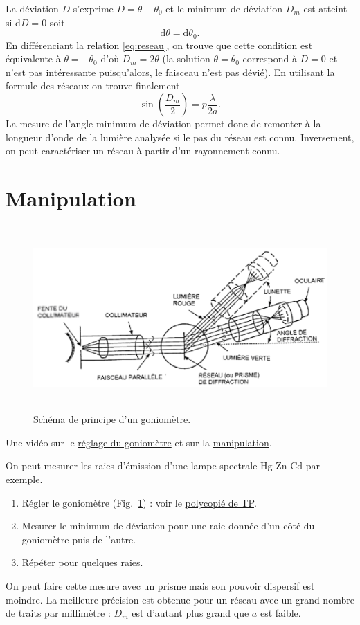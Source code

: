 \documentclass[12pt,a4paper]{article}
\renewcommand{\d}{\mathrm{d}}
\begin{document}
La déviation $D$ s'exprime $D=\theta-\theta_0$ et le minimum de déviation $D_m$ est atteint si $\d D = 0$ soit
\begin{equation}
\d\theta = \d\theta_0.
\end{equation}
En différenciant la relation \eqref{eq:reseau}, on trouve que cette condition est équivalente à $\theta=-\theta_0$ d'où $D_m = 2\theta$ (la solution $\theta=\theta_0$ correspond à $D=0$ et n'est pas intéressante puisqu'alors, le faisceau n'est pas dévié).
En utilisant la formule des réseaux on trouve finalement
\begin{equation}
\sin\left(\frac{D_m}{2}\right) = p\frac{\lambda}{2a}.
\end{equation}
La mesure de l'angle minimum de déviation permet donc de remonter à la longueur d'onde de la lumière analysée si le pas du réseau est connu.
Inversement, on peut caractériser un réseau à partir d'un rayonnement connu.

\section{Manipulation}

\begin{figure}
\center
\includegraphics[height=200pt]{goniometre.png}
\caption{Schéma de principe d'un goniomètre.}
\label{fig:gonio}
\end{figure}

Une vidéo sur le \href{https://www.youtube.com/watch?v=oj9gK-VMGg8}{réglage du goniomètre} et sur la \href{https://www.youtube.com/watch?v=L8cT_YwTXzI}{manipulation}.

On peut mesurer les raies d'émission d'une lampe spectrale Hg Zn Cd par exemple.
\begin{enumerate}
\item Régler le goniomètre (Fig.~\ref{fig:gonio}) : voir le \href{http://ressources.agreg.phys.ens.fr/static/TP/serie3/Spectroscopie.pdf}{polycopié de TP}.
\item Mesurer le minimum de déviation pour une raie donnée d'un côté du goniomètre puis de l'autre.
\item Répéter pour quelques raies.
\end{enumerate}
On peut faire cette mesure avec un prisme mais son pouvoir dispersif est moindre.
La meilleure précision est obtenue pour un réseau avec un grand nombre de traits par millimètre : $D_m$ est d'autant plus grand que $a$ est faible.
\end{document}
